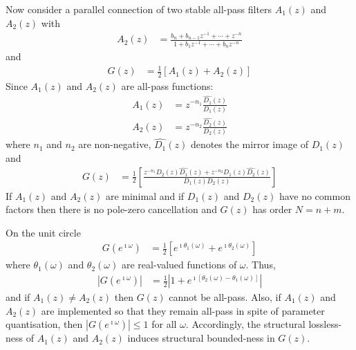 \documentclass[a4paper,twoside,10pt,english]{report}
\begin{document}
Now consider a parallel connection of two stable all-pass filters
$A_{1}\left(z\right)$ and $A_{2}\left(z\right)$ with
\begin{align*}
A_{2}\left(z\right) &=
\frac{b_{n}+b_{n-1}z^{-1}+\cdots+z^{-n}}{1+b_{1}z^{-1}+\cdots+b_{n}z^{-n}}
\end{align*}
and
\begin{align*}
G\left(z\right) &=
\frac{1}{2}\left[A_{1}\left(z\right)+A_{2}\left(z\right)\right]
\end{align*}
Since $A_{1}\left(z\right)$ and $A_{2}\left(z\right)$ are all-pass functions:
\begin{align*}
A_{1}\left(z\right) 
&= z^{-n_{1}}\frac{\hat{D_{1}}\left(z\right)}{D_{1}\left(z\right)}\\
A_{2}\left(z\right) 
&=  z^{-n_{2}}\frac{\hat{D_{2}}\left(z\right)}{D_{2}\left(z\right)}
\end{align*}
where $n_{1}$ and $n_{2}$ are non-negative, $\hat{D_{1}}\left(z\right)$
denotes the mirror image of $D_{1}\left(z\right)$ and
\begin{align*}
G\left(z\right) 
&= \frac{1}{2} \left[\frac{z^{-n_{1}}D_{2}\left(z\right)\hat{D_{1}}\left(z\right)+z^{-n_{2}}D_{1}\left(z\right)\hat{D_{2}}\left(z\right)}{D_{1}\left(z\right)D_{2}\left(z\right)}\right]
\end{align*}
If $A_{1}\left(z\right)$ and $A_{2}\left(z\right)$ are minimal and
if $D_{1}\left(z\right)$ and $D_{2}\left(z\right)$ have no common
factors then there is no pole-zero cancellation and $G\left(z\right)$
has order $N=n+m$.

On the unit circle
\begin{align*}
G\left(e^{\imath\omega}\right) &=  \frac{1}{2}\left[e^{\imath\theta_{1}\left(\omega\right)}+e^{\imath\theta_{2}\left(\omega\right)}\right]
\end{align*}
where $\theta_{1}\left(\omega\right)$ and $\theta_{2}\left(\omega\right)$
are real-valued functions of $\omega$. Thus,
\begin{align*}
\left|G\left(e^{\imath\omega}\right)\right| 
&= \frac{1}{2}\left|1+e^{\imath\left[\theta_{2}\left(\omega\right)-\theta_{1}\left(\omega\right)\right]}\right|
\end{align*}
and if $A_{1}\left(z\right) \ne A_{2}\left(z\right)$ then $G\left(z\right)$ 
cannot be all-pass. Also, if $A_{1}\left(z\right)$ and $A_{2}\left(z\right)$ are
implemented so that they remain all-pass in spite of parameter quantisation,
then $\left|G\left(e^{\imath\omega}\right)\right| \le 1$ for all $\omega$. 
Accordingly, the structural lossless-ness of $A_{1}\left(z\right)$ and 
$A_{2}\left(z\right)$ induces structural bounded-ness in $G\left(z\right)$.
\end{document}
